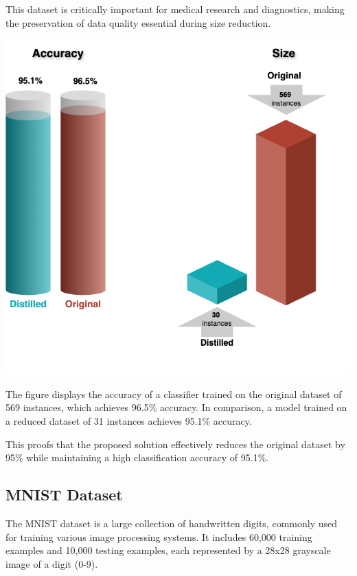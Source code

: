 This dataset is critically important for medical research and diagnostics, making the preservation of data quality essential during size reduction.

\begin{minipage}{0.6\textwidth}
    \centering
    \includegraphics[width=\textwidth]{images/breast.png}
\end{minipage}
\hspace{0.02\textwidth} %
\begin{minipage}{0.35\textwidth}
The figure displays the accuracy of a classifier trained on the original dataset of 569 instances, which achieves 96.5\% accuracy. In comparison, a model trained on a reduced dataset of 31 instances achieves 95.1\% accuracy. 

This proofs that the proposed solution effectively reduces the original dataset by 95\% while maintaining a high classification accuracy of 95.1\%.
\end{minipage}


\subsection{MNIST Dataset}

The MNIST dataset is a large collection of handwritten digits, commonly used for training various image processing systems. It includes 60,000 training examples and 10,000 testing examples, each represented by a 28x28 grayscale image of a digit (0-9). 

